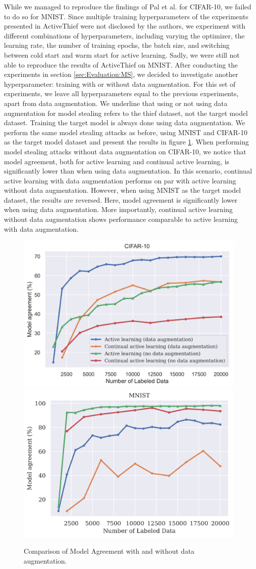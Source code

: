 While we managed to reproduce the findings of Pal et al. for CIFAR-10, we failed to do so for MNIST. Since multiple training hyperparameters of the experiments
presented in ActiveThief were not disclosed by the authors, we experiment with different combinations of hyperparameters, including varying the optimizer,
the learning rate, the number of training epochs, the batch size, and switching between cold start and warm start for active learning. Sadly, we were still
not able to reproduce the results of ActiveThief on MNIST. After conducting the experiments in section \ref{sec:Evaluation:MS}, we decided to investigate
another hyperparameter: training with or without data augmentation. For this set of experiments, we leave all hyperparameters equal to the previous experiments,
apart from data augmentation. We underline that using or not using data augmentation for model stealing refers to the thief dataset, not the target
model dataset. Training the target model is always done using data augmentation. We perform the same model stealing attacks as before, using MNIST and
CIFAR-10 as the target model dataset and present the results in figure \ref{fig:Evaluation:Results:CAL:EffectAugmentation}. When performing model stealing attacks
without data augmentation on CIFAR-10, we notice that model agreement, both for active learning and continual active learning, is significantly lower than
when using data augmentation. In this scenario, continual active learning with data augmentation performs on par with active learning without data augmentation.
However, when using MNIST as the target model dataset, the results are reversed. Here, model agreement is significantly lower when using data augmentation.
More importantly, continual active learning without data augmentation shows performance comparable to active learning with data augmentation. \par

\begin{figure}[h]
    \centering
    \includegraphics[width=0.48\linewidth]{images/results_CALMS/data_augmentation_cifar.png} \hfill
    \includegraphics[width=0.48\linewidth]{images/results_CALMS/data_augmentation_mnist.png}
    \caption{Comparison of Model Agreement with and without data augmentation.}
    \label{fig:Evaluation:Results:CAL:EffectAugmentation}
\end{figure}

